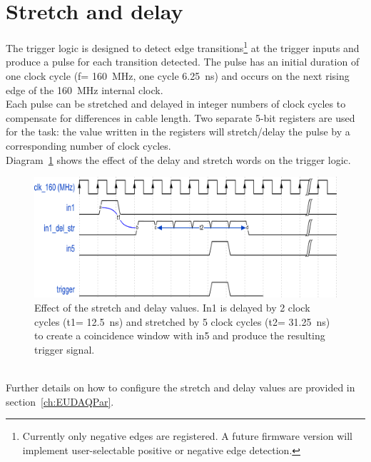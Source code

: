 \section{Stretch and delay}
The trigger logic is designed to detect edge transitions\footnote{Currently only negative edges are registered. A future firmware version will implement user-selectable positive or negative edge detection.} at the trigger inputs and produce a pulse for each transition detected. The pulse has an initial duration of one clock cycle (f= 160~MHz, one cycle 6.25~ns) and occurs on the next rising edge of the 160~MHz internal clock.\\
Each pulse can be stretched and delayed in integer numbers of clock cycles to compensate for differences in cable length. Two separate 5-bit registers are used for the task: the value written in the registers will stretch/delay the pulse by a corresponding number of clock cycles.\\
Diagram~\ref{Fig:trigger_stretchdelay} shows the effect of the delay and stretch words on the trigger logic.
\begin{figure}
  \centering
  \includegraphics[width=.95\textwidth]{./Images/tlu_trigger_logic.pdf}
  \caption{Effect of the stretch and delay values. In1 is delayed by 2 clock cycles (t1= 12.5~ns) and stretched by 5 clock cycles (t2= 31.25~ns) to create a coincidence window with in5 and produce the resulting trigger signal.}
  \label{Fig:trigger_stretchdelay}
\end{figure}\\
 Further details on how to configure the stretch and delay values are provided in section~\ref{ch:EUDAQPar}. 